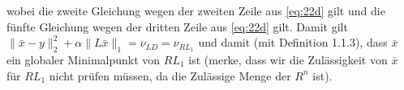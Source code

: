 \documentclass[ngerman, a4paper,12pt]{article}
\begin{document}
wobei die zweite Gleichung wegen der zweiten Zeile aus \eqref{eq:22d} gilt und die fünfte Gleichung wegen der dritten Zeile aus \eqref{eq:22d} gilt. Damit gilt $\|\bar{x} - y\|_2^2 + \alpha \| L\bar{x}\|_1 = \nu_{LD} = \nu_{RL_1}$ und damit (mit Definition 1.1.3), dass $\bar{x}$ ein globaler Minimalpunkt von $RL_1$ ist (merke, dass wir die Zulässigkeit von $\bar{x}$ für $RL_1$ nicht prüfen müssen, da die Zulässige Menge der $R^n$ ist).

\end{document}
